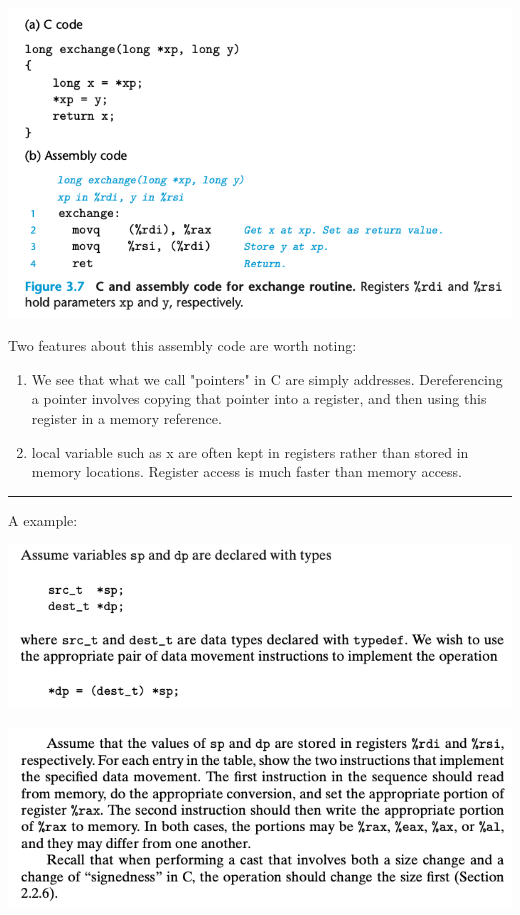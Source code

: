 \documentclass[11pt]{article}
\begin{document}
\begin{center}
\includegraphics[width=.9\linewidth]{pics/c-and-assembly-code-for-exchange-routine.png}
\end{center}


Two features about this assembly code are worth noting:\\
\begin{enumerate}
\item We see that what we call "pointers" in C are simply addresses. Dereferencing a pointer involves copying that pointer into a register, and then using this register in a memory reference.\\
\item local variable such as x are often kept in registers rather than stored in memory locations. Register access is much faster than memory access.\\
\end{enumerate}


\noindent\rule{\textwidth}{0.5pt}
A example:\\

\begin{center}
\includegraphics[width=.9\linewidth]{pics/move-practice-1.png}
\end{center}

\begin{center}
\includegraphics[width=.9\linewidth]{pics/move-practice-2.png}
\end{center}
\end{document}
